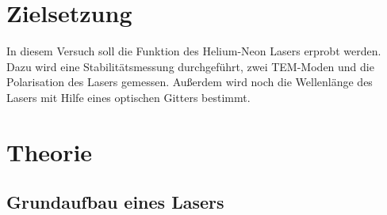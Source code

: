 \section{Zielsetzung}
\label{sec:Zielsetzung}
In diesem Versuch soll die Funktion des Helium-Neon Lasers erprobt werden. Dazu wird eine Stabilitätsmessung
durchgeführt, zwei TEM-Moden und die Polarisation des Lasers gemessen. Außerdem wird noch die Wellenlänge des
Lasers mit Hilfe eines optischen Gitters bestimmt.

\section{Theorie}
\label{sec:Theorie}
\subsection{Grundaufbau eines Lasers}
\label{sec:Laser}

\cite{sample}
